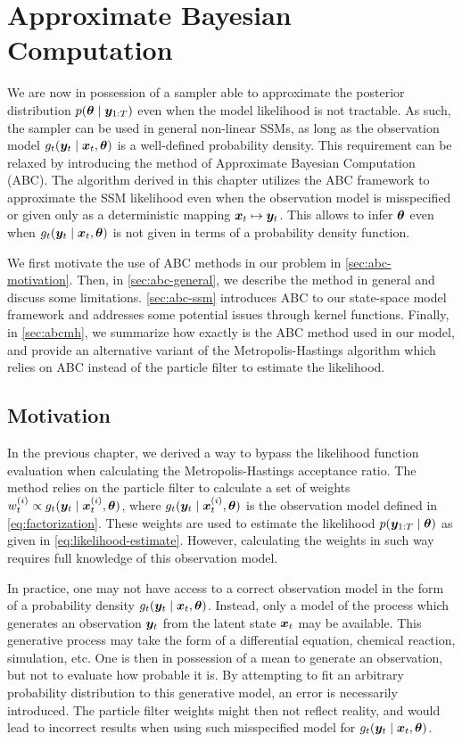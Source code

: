 \chapter{Approximate Bayesian Computation}
\label{chap:abc}

We are now in possession of a sampler able to approximate the posterior distribution $p(\bm{\theta} \mid \bm{y}_{1:T})$ even when the model likelihood is not tractable. As such, the sampler can be used in general non-linear SSMs, as long as the observation model $g_t(\bm{y}_t \mid \bm{x}_t, \bm{\theta})$ is a well-defined probability density. This requirement can be relaxed by introducing the method of Approximate Bayesian Computation (ABC). The algorithm derived in this chapter utilizes the ABC framework to approximate the SSM likelihood even when the observation model is misspecified or given only as a deterministic mapping $\bm{x}_t \mapsto \bm{y}_t$. This allows to infer $\bm{\theta}$ even when $g_t(\bm{y}_t \mid \bm{x}_t, \bm{\theta})$ is not given in terms of a probability density function.

We first motivate the use of ABC methods in our problem in \autoref{sec:abc-motivation}. Then, in \autoref{sec:abc-general}, we describe the method in general and discuss some limitations. \autoref{sec:abc-ssm} introduces ABC to our state-space model framework and addresses some potential issues through kernel functions. Finally, in \autoref{sec:abcmh}, we summarize how exactly is the ABC method used in our model, and provide an alternative variant of the Metropolis-Hastings algorithm which relies on ABC instead of the particle filter to estimate the likelihood.


\section{Motivation} \label{sec:abc-motivation}
In the previous chapter, we derived a way to bypass the likelihood function evaluation when calculating the Metropolis-Hastings acceptance ratio. The method relies on the particle filter to calculate a set of weights $w_t^{(i)} \propto g_t(\bm{y}_t \mid \bm{x}_t^{(i)}, \bm{\theta})$, where $g_t(\bm{y}_t \mid \bm{x}_t^{(i)}, \bm{\theta})$ is the observation model defined in \eqref{eq:factorization}. These weights are used to estimate the likelihood $p(\bm{y}_{1:T} \mid \bm{\theta})$ as given in \eqref{eq:likelihood-estimate}. However, calculating the weights in such way requires full knowledge of this observation model.

In practice, one may not have access to a correct observation model in the form of a probability density $g_t(\bm{y}_t \mid \bm{x}_t, \bm{\theta})$. Instead, only a model of the process which generates an observation $\bm{y}_t$ from the latent state $\bm{x}_t$ may be available. This generative process may take the form of a differential equation, chemical reaction, simulation, etc. One is then in possession of a mean to generate an observation, but not to evaluate how probable it is. By attempting to fit an arbitrary probability distribution to this generative model, an error is necessarily introduced. The particle filter weights might then not reflect reality, and would lead to incorrect results when using such misspecified model for $g_t(\bm{y}_t \mid \bm{x}_t, \bm{\theta})$.


